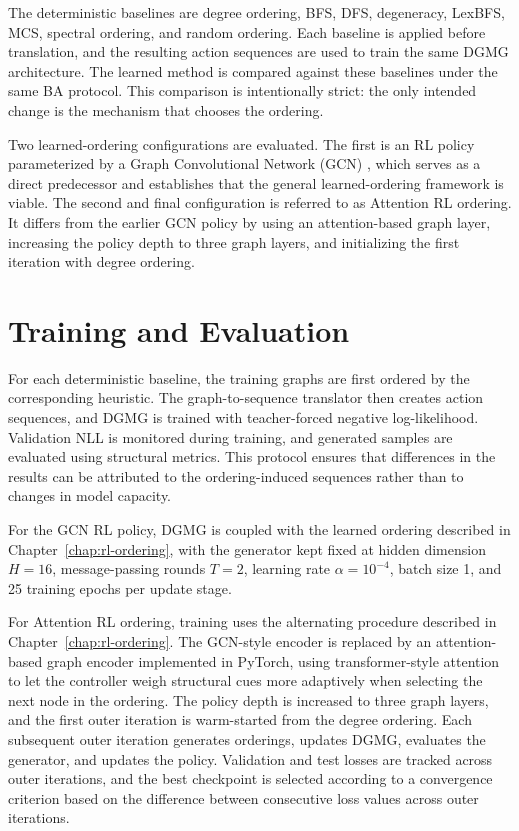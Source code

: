 The deterministic baselines are degree ordering, BFS, DFS, degeneracy, LexBFS, MCS, spectral ordering, and random ordering. Each baseline is applied before translation, and the resulting action sequences are used to train the same DGMG architecture. The learned method is compared against these baselines under the same BA protocol. This comparison is intentionally strict: the only intended change is the mechanism that chooses the ordering.

Two learned-ordering configurations are evaluated. The first is an RL policy parameterized by a Graph Convolutional Network (GCN) \cite{kipf2017gcn}, which serves as a direct predecessor and establishes that the general learned-ordering framework is viable. The second and final configuration is referred to as Attention RL ordering. It differs from the earlier GCN policy by using an attention-based graph layer, increasing the policy depth to three graph layers, and initializing the first iteration with degree ordering. %

\section{Training and Evaluation}
\label{sec:protocol-training-evaluation}

For each deterministic baseline, the training graphs are first ordered by the corresponding heuristic. The graph-to-sequence translator then creates action sequences, and DGMG is trained with teacher-forced negative log-likelihood. Validation NLL is monitored during training, and generated samples are evaluated using structural metrics. This protocol ensures that differences in the results can be attributed to the ordering-induced sequences rather than to changes in model capacity.

For the GCN RL policy, DGMG is coupled with the learned ordering described in Chapter~\ref{chap:rl-ordering}, with the generator kept fixed at hidden dimension $H=16$, message-passing rounds $T=2$, learning rate $\alpha=10^{-4}$, batch size 1, and 25 training epochs per update stage.

For Attention RL ordering, training uses the alternating procedure described in Chapter~\ref{chap:rl-ordering}. The GCN-style encoder is replaced by an attention-based graph encoder implemented in PyTorch, using transformer-style attention to let the controller weigh structural cues more adaptively when selecting the next node in the ordering. The policy depth is increased to three graph layers, and the first outer iteration is warm-started from the degree ordering. Each subsequent outer iteration generates orderings, updates DGMG, evaluates the generator, and updates the policy. Validation and test losses are tracked across outer iterations, and the best checkpoint is selected according to a convergence criterion based on the difference between consecutive loss values across outer iterations.

